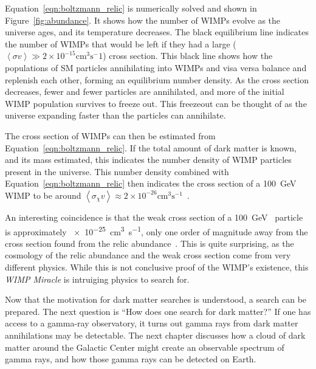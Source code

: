 Equation~\ref{eqn:boltzmann_relic} is numerically solved and shown in Figure~\ref{fig:abundance}.
It shows how the number of WIMPs evolve as the universe ages, and its temperature decreases.
The black equilibrium line indicates the number of WIMPs that would be left if they had a large ($\left \langle \sigma v \right \rangle \gg 2 \times 10^{-15} \textrm{cm}^3 \textrm{s}^-1$) cross section.
This black line shows how the populations of SM particles annihilating into WIMPs and visa versa balance and replenish each other, forming an equilibrium number density.
As the cross section decreases, fewer and fewer particles are annihilated, and more of the initial WIMP population survives to freeze out.
This freezeout can be thought of as the universe expanding faster than the particles can annihilate.

The cross section of WIMPs can then be estimated from Equation~\ref{eqn:boltzmann_relic}.
If the total amount of dark matter is known, and its mass estimated, this indicates the number density of WIMP particles present in the universe.
This number density combined with Equation~\ref{eqn:boltzmann_relic} then indicates the cross section of a \SI{100}{\GeV{}} WIMP to be around $\left \langle \sigma_{\chi} v \right \rangle \approx 2 \times 10^{-26} \textrm{cm}^{3}\textrm{s}^{-1}$~\cite{updatedWIMPRelicCrossSection}.

An interesting coincidence is that the weak cross section of a \SI{100}{\GeV{}} particle is approximately \SI{e-25}{cm^3s^{-1}}, only one order of magnitude away from the cross section found from the relic abundance~\cite{Jungman:1995df}.
This is quite surprising, as the cosmology of the relic abundance and the weak cross section come from very different physics.
While this is not conclusive proof of the WIMP's existence, this \textit{WIMP Miracle} is intruiging physics to search for.

Now that the motivation for dark matter searches is understood, a search can be prepared.
The next question is ``How does one search for dark matter?''
If one has access to a gamma-ray observatory, it turns out gamma rays from dark matter annihilations may be detectable.
The next chapter discusses how a cloud of dark matter around the Galactic Center might create an observable spectrum of gamma rays, and how those gamma rays can be detected on Earth.

